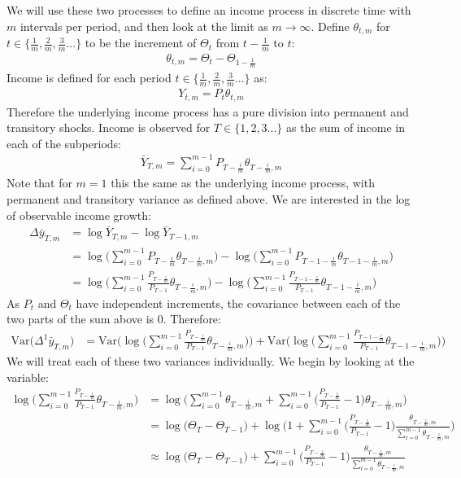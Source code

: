 We will use these two processes to define an income process in discrete time with $m$ intervals per period, and then look at the limit as $m\rightarrow \infty$. Define $\theta_{t,m}$ for $t \in \{\frac{1}{m},\frac{2}{m},\frac{3}{m}...\}$ to be the increment of $\Theta_t$ from $t-\frac{1}{m}$ to $t$:
\begin{align*}
\theta_{t,m} = \Theta_{t}-\Theta_{1-\frac{1}{m}}
\end{align*}
Income is defined for each period $t \in \{\frac{1}{m},\frac{2}{m},\frac{3}{m}...\}$ as:
\begin{align*}
Y_{t,m} = P_t \theta_{t,m}
\end{align*}
Therefore the underlying income process has a pure division into permanent and transitory shocks. Income is observed for $T \in \{1,2,3...\}$ as the sum of income in each of the subperiods:
\begin{align*}
\bar{Y}_{T,m} = \sum_{i=0}^{m-1} P_{T-\frac{i}{m}} \theta_{T-\frac{i}{m},m}
\end{align*}
Note that for $m=1$ this the same as the underlying income process, with permanent and transitory variance as defined above. We are interested in the log of observable income growth:
\begin{align*}
\Delta \bar{y}_{T,m} &= \log{\bar{Y}_{T,m}} - \log{\bar{Y}_{T-1,m}} \\
&= \log\Bigg(\sum_{i=0}^{m-1} P_{T-\frac{i}{m}} \theta_{T-\frac{i}{m},m}\Bigg)
-\log\Bigg(\sum_{i=0}^{m-1} P_{T-1-\frac{i}{m}} \theta_{T-1-\frac{i}{m},m}\Bigg) \\
&= \log\Bigg(\sum_{i=0}^{m-1} \frac{P_{T-\frac{i}{m}}}{P_{T-1}} \theta_{T-\frac{i}{m},m}\Bigg)
-\log\Bigg(\sum_{i=0}^{m-1}\frac{ P_{T-1-\frac{i}{m}}}{P_{T-1}} \theta_{T-1-\frac{i}{m},m}\Bigg) 
\end{align*}
As $P_t$ and $\Theta_t$ have independent increments, the covariance between each of the two parts of the sum above is 0. Therefore:
\begin{align*}
\mathrm{Var}\Big(\Delta^1 \bar{y}_{T,m}\Big) 
&= \mathrm{Var}\Bigg(\log\Bigg(\sum_{i=0}^{m-1} \frac{P_{T-\frac{i}{m}}}{P_{T-1}} \theta_{T-\frac{i}{m},m}\Bigg)\Bigg)
+\mathrm{Var}\Bigg(\log\Bigg(\sum_{i=0}^{m-1}\frac{ P_{T-1-\frac{i}{m}}}{P_{T-1}} \theta_{T-1-\frac{i}{m},m}\Bigg) \Bigg)
\end{align*}
We will treat each of these two variances individually. We begin by looking at the variable:
\begin{align*}
\log \Bigg(\sum_{i=0}^{m-1} \frac{P_{T-\frac{i}{m}}}{P_{T-1}} \theta_{T-\frac{i}{m},m} \Bigg)
&= \log \Bigg(\sum_{i=0}^{m-1} \theta_{T-\frac{i}{m},m} + \sum_{i=0}^{m-1} \Big(\frac{P_{T-\frac{i}{m}}}{P_{T-1}}-1\Big) \theta_{T-\frac{i}{m},m} \Bigg) \\
&= \log\Big( \Theta_T-\Theta_{T-1}\Big) + \log \Bigg(1 + \sum_{i=0}^{m-1} \Big(\frac{P_{T-\frac{i}{m}}}{P_{T-1}}-1\Big) \frac{\theta_{T-\frac{i}{m},m}}{\sum_{l=0}^{m-1} \theta_{T-\frac{l}{m},m}} \Bigg) \\
&\approx \log\Big( \Theta_T-\Theta_{T-1}\Big) +  \sum_{i=0}^{m-1} \Big(\frac{P_{T-\frac{i}{m}}}{P_{T-1}}-1\Big) \frac{\theta_{T-\frac{i}{m},m}}{\sum_{l=0}^{m-1} \theta_{T-\frac{l}{m},m}}
\end{align*}
